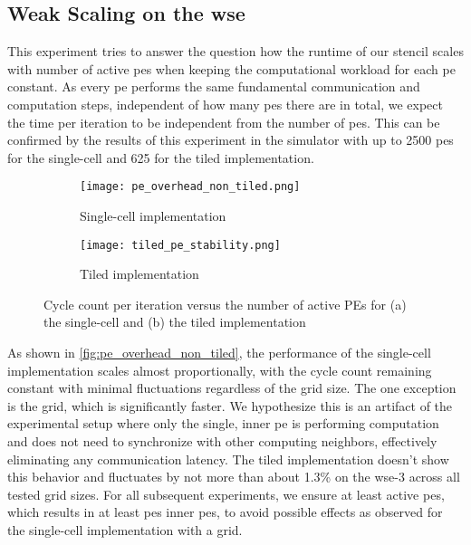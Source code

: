 \subsection{Weak Scaling on the \ac{wse}}
\label{sec:weak_scaling}
This experiment tries to answer the question how the runtime of our stencil scales with number of active \acp{pe} when keeping the computational workload for each \ac{pe} constant.
As every \ac{pe} performs the same fundamental communication and computation steps, independent of how many \acp{pe} there are in total, we expect the time per iteration to be independent from the number of \acp{pe}.
This can be confirmed by the results of this experiment in the simulator with up to \num{2500} \acp{pe} for the single-cell and \num{625} for the tiled implementation.

\begin{figure}[h]
    \centering
    \begin{subfigure}[b]{0.48\textwidth}
        \centering
        \texttt{[image: pe\_overhead\_non\_tiled.png]}
        \caption{Single-cell implementation}
        \label{fig:pe_overhead_non_tiled}
    \end{subfigure}
    \hfill
    \begin{subfigure}[b]{0.48\textwidth}
        \centering
        \texttt{[image: tiled\_pe\_stability.png]}
        \caption{Tiled implementation}
        \label{fig:tiled_pe_stability}
    \end{subfigure}
    \caption{Cycle count per iteration versus the number of active PEs for (a) the single-cell and (b) the tiled implementation}
    \label{fig:pe_overhead}
\end{figure}

As shown in \autoref{fig:pe_overhead_non_tiled}, the performance of the single-cell implementation scales almost proportionally, with the cycle count remaining constant with minimal fluctuations regardless of the grid size. The one exception is the  grid, which is significantly faster. We hypothesize this is an artifact of the experimental setup where only the single, inner \ac{pe} is performing computation and does not need to synchronize with other computing neighbors, effectively eliminating any communication latency.
The tiled implementation doesn't show this behavior and fluctuates by not more than about 1.3\% on the \ac{wse}-3 across all tested grid sizes.
For all subsequent experiments, we ensure at least  active \acp{pe}, which results in at least  \acp{pe} inner \acp{pe}, to avoid possible effects as observed for the single-cell implementation with a  grid. 

